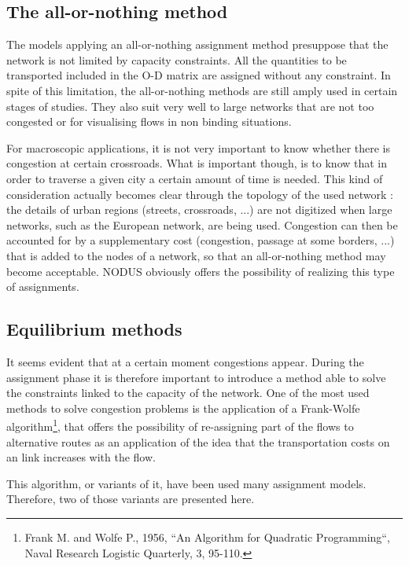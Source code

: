 \subsection{The all-or-nothing method}


The models applying an all-or-nothing assignment method presuppose that the
network is not limited by capacity constraints.  All the quantities to be
transported included in the O-D matrix are assigned without any constraint.  In
spite of this limitation, the all-or-nothing methods are still amply used in
certain stages of studies.  They also suit very well to large networks that are not too
congested or for visualising flows in non binding situations.

For macroscopic applications, it is not very important to know whether there is
congestion at certain crossroads.  What is important though, is to know that in
order to traverse a given city a certain amount of time is needed.  This kind
of consideration  actually becomes clear through the topology of the used
network : the details of urban regions (streets, crossroads, ...) are not
digitized when large networks, such as the European network, are being used.
Congestion can then be accounted for by a supplementary cost (congestion,
passage at some borders, ...) that is added to the nodes of a network, so that an
all-or-nothing method may become acceptable. NODUS obviously offers the
possibility of realizing this type of assignments.





\subsection{Equilibrium methods}


It seems evident that at a certain moment congestions appear.  During the
assignment phase it is therefore important to introduce a method able to solve the constraints linked to the capacity of the network.  One of the most
used methods to solve congestion problems is the application of a Frank-Wolfe algorithm\footnote {Frank M. and Wolfe P., 1956, ``An Algorithm for
Quadratic Programming``, Naval Research Logistic Quarterly, 3, 95-110.}, that
offers the possibility of re-assigning part of the flows to alternative routes
as an application of the idea that the transportation costs on an link increases with the flow.


This algorithm, or variants of it, have been used many assignment models.
Therefore, two of those variants are presented here.



